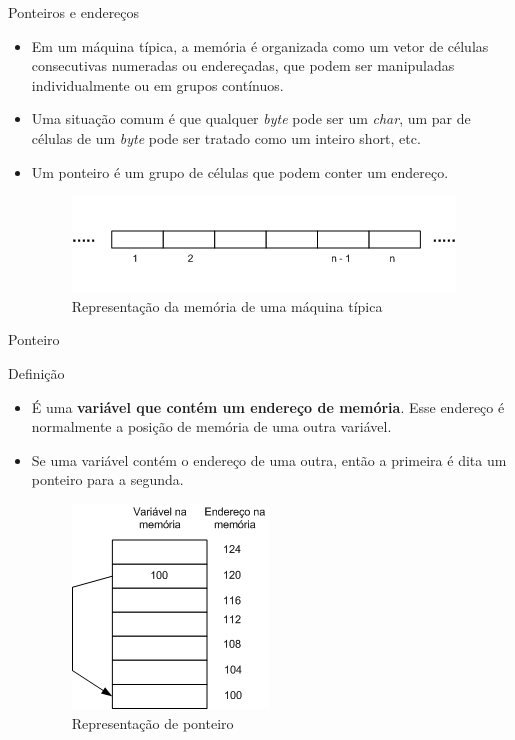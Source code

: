 \begin{frame}[c]{Ponteiros e endereços}
  \begin{itemize}[<+->]
    \item Em um máquina típica, a memória é organizada como um vetor de células consecutivas numeradas ou endereçadas, que podem ser manipuladas individualmente ou em grupos contínuos.
  \item Uma situação comum é que qualquer \textit{byte} pode ser um \textit{char}, um par de células de um \textit{byte} pode ser tratado como um inteiro short, etc.
  \item Um ponteiro é um grupo de células que podem conter um endereço.
  \begin{figure}[!ht]
     \centering
     \includegraphics[width=.5\textwidth]{figs/fig_ponteiros/representacao-memoria}  
     \caption{Representação da memória de uma máquina típica} 
  \end{figure}
  \end{itemize}
\end{frame}

\begin{frame}[plain]{Ponteiro}
  \begin{block}{Definição}
     \begin{itemize}[<+->]
        \item É uma \textbf{variável que contém um endereço de memória}. Esse endereço é normalmente a posição de memória de uma outra variável.
        \item Se uma variável contém o endereço de uma outra, então a primeira é dita um ponteiro para a segunda.
        \begin{figure}[!htpb]
          \centering
          \includegraphics[width=.3\textwidth]{figs/fig_ponteiros/exemplo-representacao-ponteiro}  
           \caption{Representação de ponteiro}    
        \end{figure}
      \end{itemize}
  \end{block}  
\end{frame}

